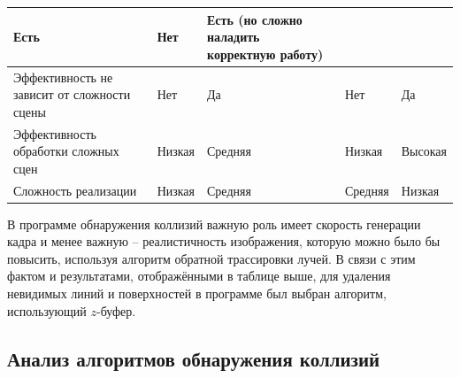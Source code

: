 \begin{adjustbox}{width=1\textwidth}
\begin{tabular}{|p{}|p{}|p{}|p{}|p{}|}
        \cellcolor{black!5}
        Есть 
        &
        \cellcolor{black!25}
        Нет
        &
        \cellcolor{black!12}
        Есть (но сложно наладить корректную работу)
        \\
        \hline
        Эффективность не зависит от сложности сцены
        &
        \cellcolor{black!25}
        Нет
        &
        \cellcolor{black!5}
        Да
        &
        \cellcolor{black!25}
        Нет
        &
        \cellcolor{black!5}
        Да
        \\
        \hline
        Эффективность обработки сложных сцен
        &
        \cellcolor{black!25}
        Низкая
        &
        \cellcolor{black!12}
        Средняя
        &
        \cellcolor{black!25}
        Низкая
        &
        \cellcolor{black!5}
        Высокая
        \\
        \hline
        Сложность реализации
        &
        \cellcolor{black!5}
        Низкая
        &
        \cellcolor{black!12}
        Средняя
        &
        \cellcolor{black!12}
        Средняя
        &
        \cellcolor{black!5}
        Низкая
        \\
        \hline
    \end{tabular}
\end{adjustbox}

\vspace{0.5cm}

В программе обнаружения коллизий важную роль имеет скорость генерации кадра и
менее важную -- реалистичность изображения, которую можно было бы повысить,
используя алгоритм обратной трассировки лучей. В связи с этим фактом и
результатами, отображёнными в таблице выше, для удаления невидимых линий и
поверхностей в программе был выбран алгоритм, использующий $z$-буфер.

\subsection{Анализ алгоритмов обнаружения коллизий}

